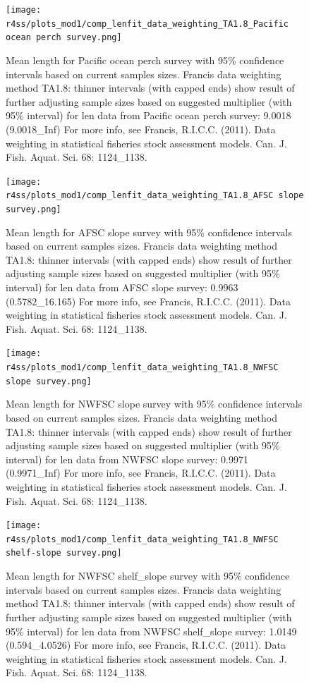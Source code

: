 \documentclass[12pt,]{article}
\begin{document}
\begin{figure}
\centering
\texttt{[image: r4ss/plots\_mod1/comp\_lenfit\_data\_weighting\_TA1.8\_Pacific ocean perch survey.png]}
\caption{Mean length for Pacific ocean perch survey with 95\% confidence
intervals based on current samples sizes. Francis data weighting method
TA1.8: thinner intervals (with capped ends) show result of further
adjusting sample sizes based on suggested multiplier (with 95\%
interval) for len data from Pacific ocean perch survey: 9.0018
(9.0018\_Inf) For more info, see Francis, R.I.C.C. (2011). Data
weighting in statistical fisheries stock assessment models. Can. J.
Fish. Aquat. Sci. 68: 1124\_1138. \label{fig:weighting_len_pop}}
\end{figure}

\begin{figure}
\centering
\texttt{[image: r4ss/plots\_mod1/comp\_lenfit\_data\_weighting\_TA1.8\_AFSC slope survey.png]}
\caption{Mean length for AFSC slope survey with 95\% confidence
intervals based on current samples sizes. Francis data weighting method
TA1.8: thinner intervals (with capped ends) show result of further
adjusting sample sizes based on suggested multiplier (with 95\%
interval) for len data from AFSC slope survey: 0.9963 (0.5782\_16.165)
For more info, see Francis, R.I.C.C. (2011). Data weighting in
statistical fisheries stock assessment models. Can. J. Fish. Aquat. Sci.
68: 1124\_1138. \label{fig:weighting_len_afsc}}
\end{figure}

\begin{figure}
\centering
\texttt{[image: r4ss/plots\_mod1/comp\_lenfit\_data\_weighting\_TA1.8\_NWFSC slope survey.png]}
\caption{Mean length for NWFSC slope survey with 95\% confidence
intervals based on current samples sizes. Francis data weighting method
TA1.8: thinner intervals (with capped ends) show result of further
adjusting sample sizes based on suggested multiplier (with 95\%
interval) for len data from NWFSC slope survey: 0.9971 (0.9971\_Inf) For
more info, see Francis, R.I.C.C. (2011). Data weighting in statistical
fisheries stock assessment models. Can. J. Fish. Aquat. Sci. 68:
1124\_1138. \label{fig:weighting_len_nwfsc}}
\end{figure}

\begin{figure}
\centering
\texttt{[image: r4ss/plots\_mod1/comp\_lenfit\_data\_weighting\_TA1.8\_NWFSC shelf-slope survey.png]}
\caption{Mean length for NWFSC shelf\_slope survey with 95\% confidence
intervals based on current samples sizes. Francis data weighting method
TA1.8: thinner intervals (with capped ends) show result of further
adjusting sample sizes based on suggested multiplier (with 95\%
interval) for len data from NWFSC shelf\_slope survey: 1.0149
(0.594\_4.0526) For more info, see Francis, R.I.C.C. (2011). Data
weighting in statistical fisheries stock assessment models. Can. J.
Fish. Aquat. Sci. 68: 1124\_1138. \label{fig:weighting_len_nwfsccombo}}
\end{figure}
\end{document}
